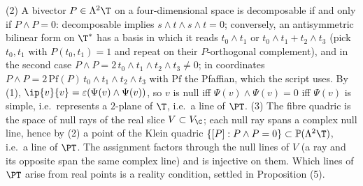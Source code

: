 (2) A bivector $P \in \Lambda^2\T$ on a four-dimensional space is decomposable if and only if $P \wedge P = 0$: decomposable implies $s\wedge t\wedge s\wedge t = 0$; conversely, an antisymmetric bilinear form on $\T^*$ has a basis in which it reads $t_0\wedge t_1$ or $t_0\wedge t_1 + t_2\wedge t_3$ (pick $t_0, t_1$ with $P(t_0,t_1) = 1$ and repeat on their $P$-orthogonal complement), and in the second case $P\wedge P = 2\,t_0\wedge t_1\wedge t_2\wedge t_3 \neq 0$; in coordinates $P\wedge P = 2\,\mathrm{Pf}(P)\, t_0\wedge t_1\wedge t_2 \wedge t_3$ with $\mathrm{Pf}$ the Pfaffian, which the script uses. By (1), $\ip{v}{v} = \varepsilon(\Psi(v)\wedge\Psi(v))$, so $v$ is null iff $\Psi(v)\wedge\Psi(v) = 0$ iff $\Psi(v)$ is simple, i.e.\ represents a $2$-plane of $\T$, i.e.\ a line of $\PT$.
(3) The fibre quadric is the space of null rays of the real slice $V \subset V_\C$; each null ray spans a complex null line, hence by (2) a point of the Klein quadric $\{[P] : P\wedge P = 0\} \subset \mathbb{P}(\Lambda^2\T)$, i.e.\ a line of $\PT$. The assignment factors through the null lines of $V$ (a ray and its opposite span the same complex line) and is injective on them. Which lines of $\PT$ arise from real points is a reality condition, settled in Proposition (5).
